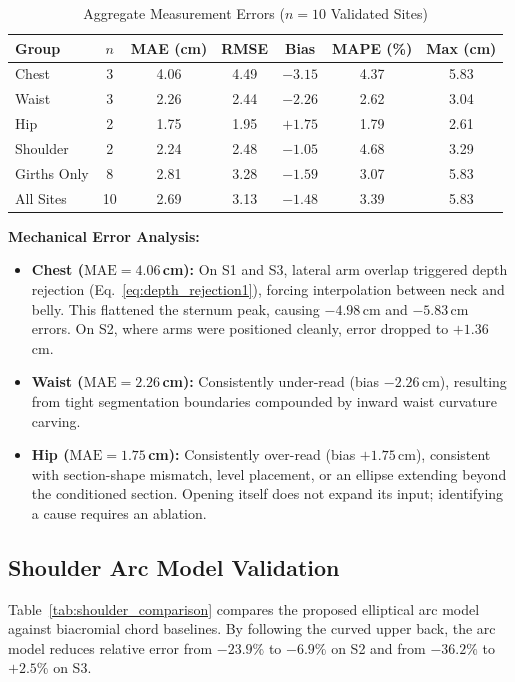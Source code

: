 \documentclass[journal]{IEEEtran}
\begin{document}
\begin{table}[!t]
\caption{Aggregate Measurement Errors ($n=10$ Validated Sites)}
\label{tab:aggregate_error}
\centering
\begin{tabular}{lcccccc}
\toprule
\textbf{Group} & $n$ & \textbf{MAE (cm)} & \textbf{RMSE} & \textbf{Bias} & \textbf{MAPE (\%)} & \textbf{Max (cm)} \\
\midrule
Chest & 3 & 4.06 & 4.49 & $-3.15$ & 4.37 & 5.83 \\
Waist & 3 & 2.26 & 2.44 & $-2.26$ & 2.62 & 3.04 \\
Hip & 2 & 1.75 & 1.95 & $+1.75$ & 1.79 & 2.61 \\
Shoulder & 2 & 2.24 & 2.48 & $-1.05$ & 4.68 & 3.29 \\
\midrule
Girths Only & 8 & 2.81 & 3.28 & $-1.59$ & 3.07 & 5.83 \\
All Sites & 10 & 2.69 & 3.13 & $-1.48$ & 3.39 & 5.83 \\
\bottomrule
\end{tabular}
\end{table}

\noindent \textbf{Mechanical Error Analysis:}
\begin{itemize}
    \item \textbf{Chest ($\text{MAE} = 4.06$\,cm):} On S1 and S3, lateral arm overlap triggered depth rejection (Eq.~\eqref{eq:depth_rejection1}), forcing interpolation between neck and belly. This flattened the sternum peak, causing $-4.98$\,cm and $-5.83$\,cm errors. On S2, where arms were positioned cleanly, error dropped to $+1.36$\,cm.
    \item \textbf{Waist ($\text{MAE} = 2.26$\,cm):} Consistently under-read (bias $-2.26$\,cm), resulting from tight segmentation boundaries compounded by inward waist curvature carving.
    \item \textbf{Hip ($\text{MAE} = 1.75$\,cm):} Consistently over-read (bias $+1.75$\,cm), consistent with section-shape mismatch, level placement, or an ellipse extending beyond the conditioned section. Opening itself does not expand its input; identifying a cause requires an ablation.
\end{itemize}

\subsection{Shoulder Arc Model Validation}
Table~\ref{tab:shoulder_comparison} compares the proposed elliptical arc model against biacromial chord baselines. By following the curved upper back, the arc model reduces relative error from $-23.9\%$ to $-6.9\%$ on S2 and from $-36.2\%$ to $+2.5\%$ on S3.
\end{document}
